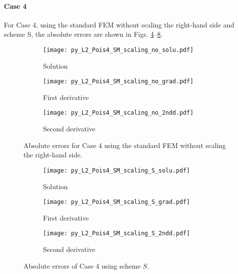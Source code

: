 \documentclass[review,3p]{elsarticle}
\begin{document}
\newpage
\paragraph{Case 4}
For Case 4, using the standard FEM without scaling the right-hand side and scheme S, the absolute errors are shown in Figs. \ref{py_L2_Pois4_SM_scaling_no}--\ref{py_L2_Pois4_SM_scaling_S}.

\begin{figure}[!ht]
    \begin{subfigure}{5.5cm}
        \texttt{[image: py\_L2\_Pois4\_SM\_scaling\_no\_solu.pdf]}
        \caption{Solution}
        \label{py_L2_Pois4_SM_scaling_no_solu}
    \end{subfigure}
    \hspace{-0.2cm}
    \begin{subfigure}{5.5cm}
        \texttt{[image: py\_L2\_Pois4\_SM\_scaling\_no\_grad.pdf]}
        \caption{First derivative}
        \label{py_L2_Pois4_SM_scaling_no_grad}
    \end{subfigure}
    \hspace{-0.2cm}
    \begin{subfigure}{5.5cm}
        \texttt{[image: py\_L2\_Pois4\_SM\_scaling\_no\_2ndd.pdf]}
        \caption{Second derivative}
        \label{py_L2_Pois4_SM_scaling_no_2ndd}
    \end{subfigure}
\caption{Absolute errors for Case 4 using the standard FEM without scaling the right-hand side.}
\label{py_L2_Pois4_SM_scaling_no}
\end{figure}

\begin{figure}[!ht]
    \begin{subfigure}{5.5cm}
        \texttt{[image: py\_L2\_Pois4\_SM\_scaling\_S\_solu.pdf]}
        \caption{Solution}
        \label{py_L2_Pois4_SM_scaling_S_solu}
    \end{subfigure}
    \hspace{-0.2cm}
    \begin{subfigure}{5.5cm}
        \texttt{[image: py\_L2\_Pois4\_SM\_scaling\_S\_grad.pdf]}
        \caption{First derivative}
        \label{py_L2_Pois4_SM_scaling_S_grad}
    \end{subfigure}
    \hspace{-0.2cm}
    \begin{subfigure}{5.5cm}
        \texttt{[image: py\_L2\_Pois4\_SM\_scaling\_S\_2ndd.pdf]}
        \caption{Second derivative}
        \label{py_L2_Pois4_SM_scaling_S_2ndd}
    \end{subfigure}
\caption{Absolute errors of Case 4 using scheme $S$.}
\label{py_L2_Pois4_SM_scaling_S}
\end{figure}
\end{document}
